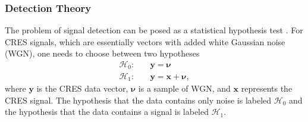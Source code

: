 \subsubsection*{Detection Theory}

The problem of signal detection can be posed as a statistical hypothesis test \cite{detection_theory}. For CRES signals, which are essentially vectors with added white Gaussian noise (WGN), one needs to choose between two hypotheses
\begin{align}
    \mathcal{H}_0:&\quad\bm{y}=\bm{\nu}\\
    \mathcal{H}_1:&\quad\bm{y}=\bm{x}+\bm{\nu},
\end{align}
where $\bm{y}$ is the CRES data vector, $\bm{\nu}$ is a sample of WGN, and $\bm{x}$ represents the CRES signal. The hypothesis that the data contains only noise is labeled $\mathcal{H}_0$ and the hypothesis that the data contains a signal is labeled $\mathcal{H}_1$.


